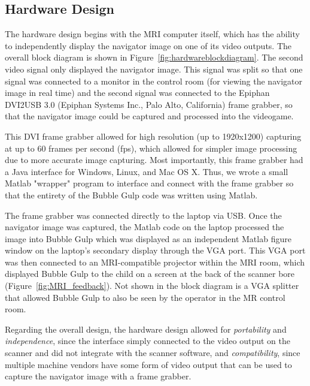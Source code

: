 \subsection{Hardware Design}
	The hardware design begins with the MRI computer itself, which has the ability to independently display the navigator image on one of its video outputs. The overall block diagram is shown in Figure~\ref{fig:hardwareblockdiagram}. The second video signal only displayed the navigator image. This signal was split so that one signal was connected to a monitor in the control room (for viewing the navigator image in real time) and the second signal was connected to the Epiphan DVI2USB 3.0 (Epiphan Systems Inc., Palo Alto, California) frame grabber, so that the navigator image could be captured and processed into the videogame.
	
	This DVI frame grabber allowed for high resolution (up to 1920x1200) capturing at up to 60 frames per second (fps), which allowed for simpler image processing due to more accurate image capturing. Most importantly, this frame grabber had a Java interface for Windows, Linux, and Mac OS X. Thus, we wrote a small Matlab "wrapper" program to interface and connect with the frame grabber so that the entirety of the Bubble Gulp code was written using Matlab.
	
	The frame grabber was connected directly to the laptop via USB. Once the navigator image was captured, the Matlab code on the laptop processed the image into Bubble Gulp which was displayed as an independent Matlab figure window on the laptop's secondary display through the VGA port. This VGA port was then connected to an MRI-compatible projector within the MRI room, which displayed Bubble Gulp to the child on a screen at the back of the scanner bore (Figure~\ref{fig:MRI_feedback}). Not shown in the block diagram is a VGA splitter that allowed Bubble Gulp to also be seen by the operator in the MR control room.
	
	Regarding the overall design, the hardware design allowed for \textit{portability} and \textit{independence}, since the interface simply connected to the video output on the scanner and did not integrate with the scanner software, and \textit{compatibility}, since multiple machine vendors have some form of video output that can be used to capture the navigator image with a frame grabber.

